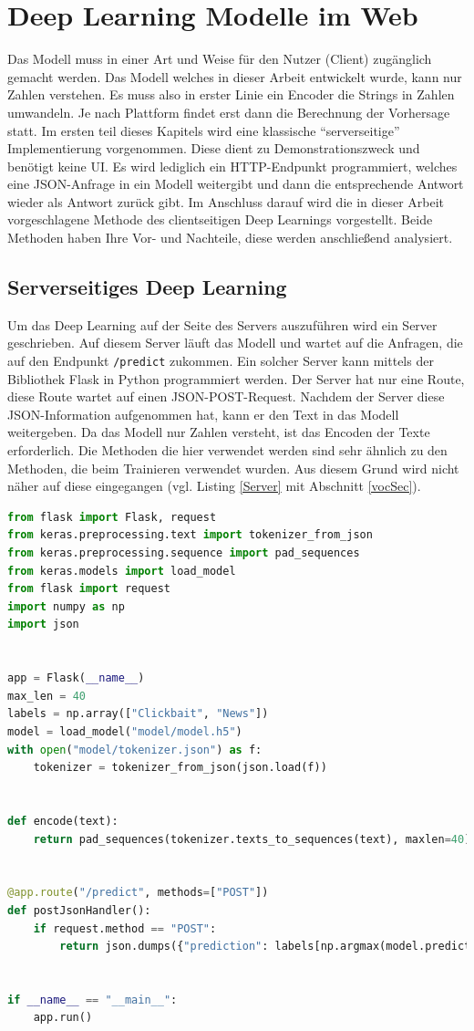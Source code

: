 \chapter{Deep Learning Modelle im Web}\label{ch8}
Das Modell muss in einer Art und Weise für den Nutzer (Client) zugänglich gemacht werden. Das Modell welches in dieser Arbeit entwickelt wurde, kann nur Zahlen verstehen. Es muss also in erster Linie ein Encoder die Strings in Zahlen umwandeln. Je nach Plattform findet erst dann die Berechnung der Vorhersage statt. Im ersten teil dieses Kapitels wird eine klassische \enquote{serverseitige} Implementierung vorgenommen. Diese dient zu Demonstrationszweck und benötigt keine UI. Es wird lediglich ein HTTP-Endpunkt programmiert, welches eine JSON-Anfrage in ein Modell weitergibt und dann die entsprechende Antwort wieder als Antwort zurück gibt. Im Anschluss darauf wird die in dieser Arbeit vorgeschlagene Methode des clientseitigen Deep Learnings vorgestellt. Beide Methoden haben Ihre Vor- und Nachteile, diese werden anschließend analysiert.

\section{Serverseitiges Deep Learning}
Um das Deep Learning auf der Seite des Servers auszuführen wird ein Server geschrieben. Auf diesem Server läuft das Modell und wartet auf die Anfragen, die auf den Endpunkt \texttt{/predict} zukommen. Ein solcher Server kann mittels der Bibliothek Flask in Python programmiert werden. Der Server hat nur eine Route, diese Route wartet auf einen JSON-POST-Request. Nachdem der Server diese JSON-Information aufgenommen hat, kann er den Text in das Modell weitergeben. Da das Modell nur Zahlen versteht, ist das Encoden der Texte erforderlich. Die Methoden die hier verwendet werden sind sehr ähnlich zu den Methoden, die beim Trainieren verwendet wurden. Aus diesem Grund wird nicht näher auf diese eingegangen  (vgl. Listing \ref{Server} mit Abschnitt \ref{vocSec}).

\begin{lstlisting}[language=Python,caption=Beispiel eines Servers für die Vorhersage von Clickbaits, label={Server}]
from flask import Flask, request
from keras.preprocessing.text import tokenizer_from_json
from keras.preprocessing.sequence import pad_sequences
from keras.models import load_model
from flask import request
import numpy as np
import json


app = Flask(__name__)
max_len = 40
labels = np.array(["Clickbait", "News"])
model = load_model("model/model.h5")
with open("model/tokenizer.json") as f:
    tokenizer = tokenizer_from_json(json.load(f))


def encode(text):
    return pad_sequences(tokenizer.texts_to_sequences(text), maxlen=40)


@app.route("/predict", methods=["POST"])
def postJsonHandler():
    if request.method == "POST":
        return json.dumps({"prediction": labels[np.argmax(model.predict(encode([request.get_json()["text"]])))]})

        
if __name__ == "__main__":
    app.run()
\end{lstlisting}




